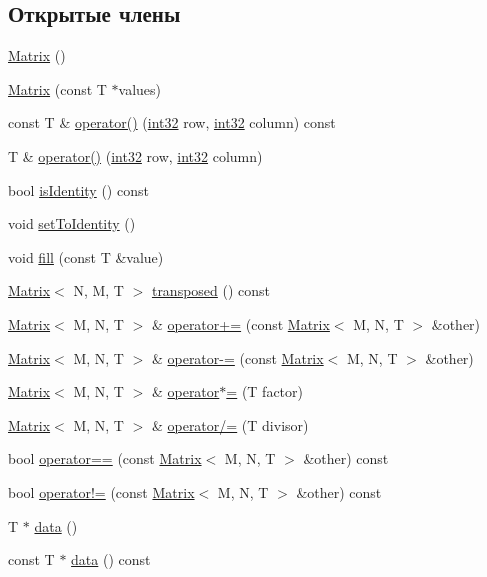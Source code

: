 \subsection*{Открытые члены}
\begin{DoxyCompactItemize}
\item 
\hyperlink{class_matrix_a057b8f4cfbddb0331c0dfb8d6d31310e}{Matrix} ()
\item 
\hyperlink{class_matrix_a6dd2e82ed0b8ea67ea0519882175bd67}{Matrix} (const T $\ast$values)
\item 
const T \& \hyperlink{class_matrix_aa093a7de8b27d19e6eb66b09f9da7b87}{operator()} (\hyperlink{number_8h_a43d43196463bde49cb067f5c20ab8481}{int32} row, \hyperlink{number_8h_a43d43196463bde49cb067f5c20ab8481}{int32} column) const 
\item 
T \& \hyperlink{class_matrix_acf0955eccefd5abe0f0a8ea8f5f1582e}{operator()} (\hyperlink{number_8h_a43d43196463bde49cb067f5c20ab8481}{int32} row, \hyperlink{number_8h_a43d43196463bde49cb067f5c20ab8481}{int32} column)
\item 
bool \hyperlink{class_matrix_aa21a8169dde52a31ee25fa40c7b3cbaf}{is\+Identity} () const 
\item 
void \hyperlink{class_matrix_aa571c8458a34695e88e076b3307cbdeb}{set\+To\+Identity} ()
\item 
void \hyperlink{class_matrix_a77bac0ccf5799c0249fb77f78246bf75}{fill} (const T \&value)
\item 
\hyperlink{class_matrix}{Matrix}$<$ N, M, T $>$ \hyperlink{class_matrix_aa07c344f3ac92f1b1ee9ebc1b42d4973}{transposed} () const 
\item 
\hyperlink{class_matrix}{Matrix}$<$ M, N, T $>$ \& \hyperlink{class_matrix_a29caf32b1bacaebe05277f056bbe0229}{operator+=} (const \hyperlink{class_matrix}{Matrix}$<$ M, N, T $>$ \&other)
\item 
\hyperlink{class_matrix}{Matrix}$<$ M, N, T $>$ \& \hyperlink{class_matrix_ae6a824c0ec0f0f067b167f8b45fa1910}{operator-\/=} (const \hyperlink{class_matrix}{Matrix}$<$ M, N, T $>$ \&other)
\item 
\hyperlink{class_matrix}{Matrix}$<$ M, N, T $>$ \& \hyperlink{class_matrix_a660133e52cdffddc553e2f05c693cd96}{operator$\ast$=} (T factor)
\item 
\hyperlink{class_matrix}{Matrix}$<$ M, N, T $>$ \& \hyperlink{class_matrix_a9b870fa2d8a56715f6a9398854cfdb16}{operator/=} (T divisor)
\item 
bool \hyperlink{class_matrix_a9c9f9ffe07d56bb9a14f7bb89113af9e}{operator==} (const \hyperlink{class_matrix}{Matrix}$<$ M, N, T $>$ \&other) const 
\item 
bool \hyperlink{class_matrix_aea308a4ad5bea479d5607e79792eee96}{operator!=} (const \hyperlink{class_matrix}{Matrix}$<$ M, N, T $>$ \&other) const 
\item 
T $\ast$ \hyperlink{class_matrix_a5e6ffc416f13f4f14dd8087da2234d40}{data} ()
\item 
const T $\ast$ \hyperlink{class_matrix_a8277fe32f0783374b7fea39e6d80ca7c}{data} () const 
\end{DoxyCompactItemize}
